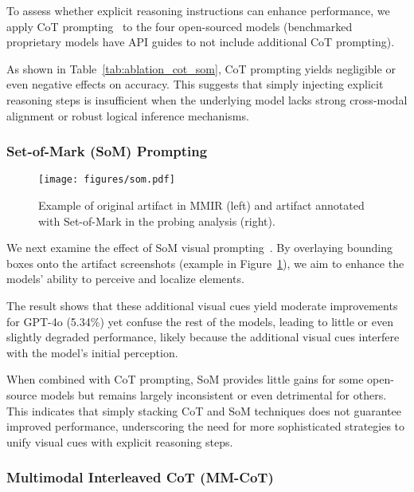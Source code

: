 To assess whether explicit reasoning instructions can enhance performance, we apply CoT prompting~\cite{chain-of-thought} to the four open-sourced models (benchmarked proprietary models have API guides to not include additional CoT prompting).

As shown in Table~\ref{tab:ablation_cot_som}, CoT prompting yields negligible or even negative effects on accuracy. This suggests that simply injecting explicit reasoning steps is insufficient when the underlying model lacks strong cross-modal alignment or robust logical inference mechanisms.

\subsubsection{Set-of-Mark (SoM) Prompting}

\begin{figure}[h]
\setlength\tabcolsep{0pt}
\setlength{\abovecaptionskip}{0.1cm}
    \centering
    \texttt{[image: figures/som.pdf]}
    \caption{Example of original artifact in MMIR (left) and artifact annotated with Set-of-Mark in the probing analysis (right).}
    \label{fig:som}
\end{figure}

We next examine the effect of SoM visual prompting~\cite{Yang2023SetofMarkPU}. By overlaying bounding boxes onto the artifact screenshots (example in Figure~\ref{fig:som}), we aim to enhance the models’ ability to perceive and localize elements.

The result shows that these additional visual cues yield moderate improvements for GPT-4o (5.34\%) yet confuse the rest of the models, leading to little or even slightly degraded performance, likely because the additional visual cues interfere with the model’s initial perception.

When combined with CoT prompting, SoM provides little gains for some open-source models but remains largely inconsistent or even detrimental for others. This indicates that simply stacking CoT and SoM techniques does not guarantee improved performance, underscoring the need for more sophisticated strategies to unify visual cues with explicit reasoning steps.

\subsubsection{Multimodal Interleaved CoT (MM-CoT)}

